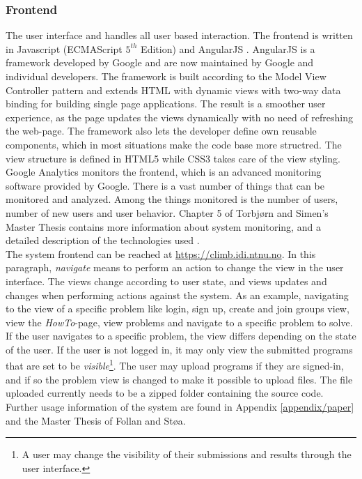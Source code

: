 \subsubsection{Frontend} The user interface and handles all user based interaction. The frontend is written in Javascript (ECMAScript $5^{th}$ Edition) and AngularJS \cite{m:angular}. AngularJS is a framework developed by Google and are now maintained by Google and individual developers. The framework is built according to the Model View Controller pattern and extends HTML with dynamic views with two-way data binding for building single page applications. The result is a smoother user experience, as the page updates the views dynamically with no need of refreshing the web-page. The framework also lets the developer define own reusable components, which in most situations make the code base more structred. The view structure is defined in HTML5 while CSS3 takes care of the view styling. Google Analytics monitors the frontend, which is an advanced monitoring software provided by Google. There is a vast number of things that can be monitored and analyzed. Among the things monitored is the number of users, number of new users and user behavior. Chapter 5 of Torbjørn and Simen's Master Thesis contains more information about system monitoring, and a detailed description of the technologies used \cite{mt:T&S}. \\

The system frontend can be reached at \url{https://climb.idi.ntnu.no}. In this paragraph, \textit{navigate} means to perform an action to change the view in the user interface. The views change according to user state, and views updates and changes when performing actions against the system. As an example, navigating to the view of a specific problem   like login, sign up, create and join groups view, view the \textit{HowTo}-page, view problems and navigate to a specific problem to solve. If the user navigates to a specific problem, the view differs depending on the state of the user. If the user is not logged in, it may only view the submitted programs that are set to be \textit{visible}\footnote{A user may change the visibility of their submissions and results through the user interface.}. The user may upload programs if they are signed-in, and if so the problem view is changed to make it possible to upload files. The file uploaded currently needs to be a zipped folder containing the source code. Further usage information of the system are found in Appendix \ref{appendix/paper} and the Master Thesis of Follan and Støa. \\


